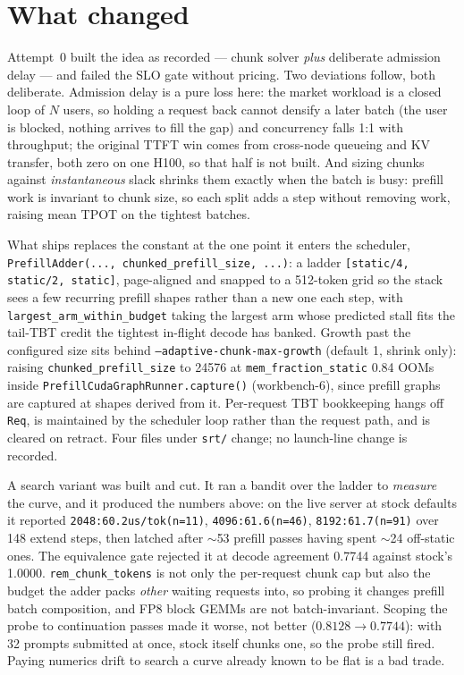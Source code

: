 \documentclass[10pt,twocolumn]{article}
\begin{document}
\section{What changed}
Attempt~0 built the idea as recorded --- chunk solver \emph{plus} deliberate
admission delay --- and failed the SLO gate without pricing.  Two deviations
follow, both deliberate.  Admission delay is a pure loss here: the market
workload is a closed loop of $N$ users, so holding a request back cannot densify
a later batch (the user is blocked, nothing arrives to fill the gap) and
concurrency falls 1:1 with throughput; the original TTFT win comes from
cross-node queueing and KV transfer, both zero on one H100, so that half is not
built.  And sizing chunks against \emph{instantaneous} slack shrinks them
exactly when the batch is busy: prefill work is invariant to chunk size, so each
split adds a step without removing work, raising mean TPOT on the tightest
batches.

What ships replaces the constant at the one point it enters the scheduler,
\texttt{PrefillAdder(...,\,chunked\_prefill\_size,\,...)}: a ladder
\texttt{[static/4, static/2, static]}, page-aligned and snapped to a 512-token
grid so the stack sees a few recurring prefill shapes rather than a new one each
step, with \texttt{largest\_arm\_within\_budget} taking the largest arm whose
predicted stall fits the tail-TBT credit the tightest in-flight decode has
banked.  Growth past the configured size sits behind
\texttt{--adaptive-chunk-max-growth} (default 1, shrink only): raising
\texttt{chunked\_prefill\_size} to 24576 at \texttt{mem\_fraction\_static} 0.84
OOMs inside \texttt{PrefillCudaGraphRunner.capture()} (workbench-6), since
prefill graphs are captured at shapes derived from it.  Per-request TBT
bookkeeping hangs off \texttt{Req}, is maintained by the scheduler loop rather
than the request path, and is cleared on retract.  Four files under
\texttt{srt/} change; no launch-line change is recorded.

A search variant was built and cut.  It ran a bandit over the ladder to
\emph{measure} the curve, and it produced the numbers above: on the live server
at stock defaults it reported \texttt{2048:60.2us/tok(n=11)},
\texttt{4096:61.6(n=46)}, \texttt{8192:61.7(n=91)} over 148 extend steps, then
latched after $\sim$53 prefill passes having spent $\sim$24 off-static ones.
The equivalence gate rejected it at decode agreement 0.7744 against stock's
1.0000.  \texttt{rem\_chunk\_tokens} is not only the per-request chunk cap but
also the budget the adder packs \emph{other} waiting requests into, so probing
it changes prefill batch composition, and FP8 block GEMMs are not
batch-invariant.  Scoping the probe to continuation passes made it worse, not
better ($0.8128 \rightarrow 0.7744$): with 32 prompts submitted at once, stock
itself chunks one, so the probe still fired.  Paying numerics drift to search a
curve already known to be flat is a bad trade.
\end{document}
